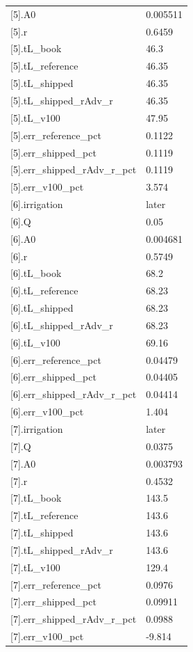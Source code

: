 {\begin{longtable}{p{}p{}}
{}[5].A0 & 0.005511\\
{}[5].r & 0.6459\\
{}[5].tL\_book & 46.3\\
{}[5].tL\_reference & 46.35\\
{}[5].tL\_shipped & 46.35\\
{}[5].tL\_shipped\_rAdv\_r & 46.35\\
{}[5].tL\_v100 & 47.95\\
{}[5].err\_reference\_pct & 0.1122\\
{}[5].err\_shipped\_pct & 0.1119\\
{}[5].err\_shipped\_rAdv\_r\_pct & 0.1119\\
{}[5].err\_v100\_pct & 3.574\\
{}[6].irrigation & later\\
{}[6].Q & 0.05\\
{}[6].A0 & 0.004681\\
{}[6].r & 0.5749\\
{}[6].tL\_book & 68.2\\
{}[6].tL\_reference & 68.23\\
{}[6].tL\_shipped & 68.23\\
{}[6].tL\_shipped\_rAdv\_r & 68.23\\
{}[6].tL\_v100 & 69.16\\
{}[6].err\_reference\_pct & 0.04479\\
{}[6].err\_shipped\_pct & 0.04405\\
{}[6].err\_shipped\_rAdv\_r\_pct & 0.04414\\
{}[6].err\_v100\_pct & 1.404\\
{}[7].irrigation & later\\
{}[7].Q & 0.0375\\
{}[7].A0 & 0.003793\\
{}[7].r & 0.4532\\
{}[7].tL\_book & 143.5\\
{}[7].tL\_reference & 143.6\\
{}[7].tL\_shipped & 143.6\\
{}[7].tL\_shipped\_rAdv\_r & 143.6\\
{}[7].tL\_v100 & 129.4\\
{}[7].err\_reference\_pct & 0.0976\\
{}[7].err\_shipped\_pct & 0.09911\\
{}[7].err\_shipped\_rAdv\_r\_pct & 0.0988\\
{}[7].err\_v100\_pct & -9.814\\
\bottomrule\end{longtable}}

